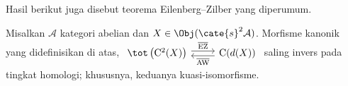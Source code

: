Hasil berikut juga disebut teorema Eilenberg--Zilber yang diperumum.

\begin{theorem}\label{prop:Eilenberg-Zilber}
	Misalkan $\mathcal{A}$ kategori abelian dan
	$X\in\Obj(\cate{s}^2\mathcal{A})$. Morfisme kanonik yang didefinisikan
	di atas,
	$\begin{tikzcd}
		\tot \left(\mathrm{C}^2(X)\right) \arrow[shift left, r, "\overline{\mathrm{EZ}}"] & \mathrm{C}(d(X)) \arrow[shift left, l, "\overline{\mathrm{AW}}"]
	\end{tikzcd}$
	saling invers pada tingkat homologi; khususnya, keduanya
	kuasi-isomorfisme.
\end{theorem}
